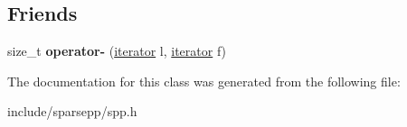 \subsection*{Friends}
\begin{DoxyCompactItemize}
\item 
size\+\_\+t {\bfseries operator-\/} (\hyperlink{classspp___1_1_two__d__iterator}{iterator} l, \hyperlink{classspp___1_1_two__d__iterator}{iterator} f)\hypertarget{classspp___1_1_two__d__iterator_af52fb9956d6e39769568d45f537863c7}{}\label{classspp___1_1_two__d__iterator_af52fb9956d6e39769568d45f537863c7}

\end{DoxyCompactItemize}


The documentation for this class was generated from the following file\+:\begin{DoxyCompactItemize}
\item 
include/sparsepp/spp.\+h\end{DoxyCompactItemize}
